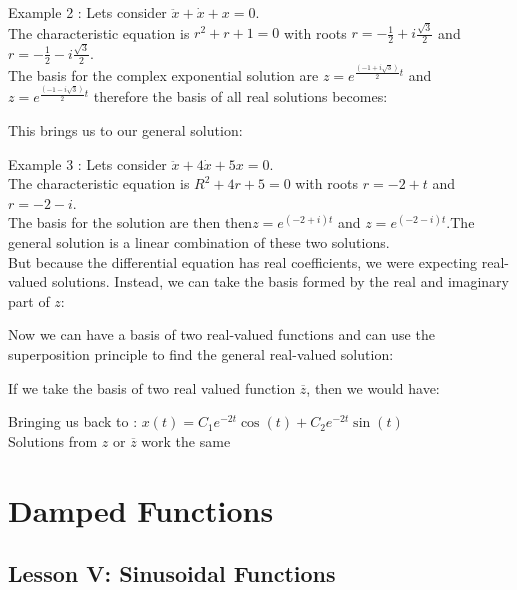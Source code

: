 \documentclass[11pt, openright]{book}
\begin{document}
\begin{dent}{Example 2 :}
    Lets consider $\ddot{x}+\dot{x}+x=0$.\\
    The characteristic equation is $r^2+r+1=0$ with roots $r=-\frac{1}{2}+i\frac{\sqrt{3}}{2}$ and $r=-\frac{1}{2}-i\frac{\sqrt{3}}{2}$.\\
    The basis for the complex exponential solution are $z=e^{\frac{(-1+i\sqrt{3})}{2}t}$ and $z=e^{\frac{(-1-i\sqrt{3})}{2}t}$ therefore the basis of all real solutions becomes:

    This brings us to our general solution:
\end{dent}

\begin{dent}{Example 3 :}
    Lets consider $\ddot{x}+4\dot{x}+5x=0$.\\
    The characteristic equation is $R^2+4r+5=0$ with roots $r=-2+t$ and $r=-2-i$.\\
    The basis for the solution are then then$z=e^{(-2+i)t}$ and $z=e^{(-2-i)t}$.The general solution is a linear combination of these two solutions.\\
    But because the differential equation has real coefficients, we were expecting real-valued solutions. Instead, we can take the basis formed by the real and imaginary part of $z$:

    Now we can have a basis of two real-valued functions and can use the superposition principle to find the general real-valued solution:

    If we take the basis of two real valued function $\overline{z}$, then we would have:

    Bringing us back to : $x(t)=C_1e^{-2t}\cos(t)+C_2e^{-2t}\sin(t)$\\
    Solutions from $z$ or $\overline{z}$ work the same
\end{dent}

\chapter{Damped Functions}

\section{Lesson V: Sinusoidal Functions}
\end{document}
